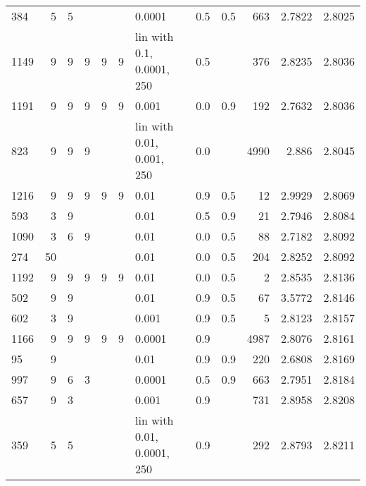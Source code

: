 \begin{longtable}{lrrrrrlrrrrr}
  384 &       5 & 5 &   &   &   &                      0.0001 &      0.5 &    0.5 &     663 &     2.7822 &        2.8025 \\
 1149 &       9 & 9 & 9 & 9 & 9 &   lin with 0.1, 0.0001, 250 &      0.5 &        &     376 &     2.8235 &        2.8036 \\
 1191 &       9 & 9 & 9 & 9 & 9 &                       0.001 &      0.0 &    0.9 &     192 &     2.7632 &        2.8036 \\
  823 &       9 & 9 & 9 &   &   &   lin with 0.01, 0.001, 250 &      0.0 &        &    4990 &      2.886 &        2.8045 \\
 1216 &       9 & 9 & 9 & 9 & 9 &                        0.01 &      0.9 &    0.5 &      12 &     2.9929 &        2.8069 \\
  593 &       3 & 9 &   &   &   &                        0.01 &      0.5 &    0.9 &      21 &     2.7946 &        2.8084 \\
 1090 &       3 & 6 & 9 &   &   &                        0.01 &      0.0 &    0.5 &      88 &     2.7182 &        2.8092 \\
  274 &      50 &   &   &   &   &                        0.01 &      0.0 &    0.5 &     204 &     2.8252 &        2.8092 \\
 1192 &       9 & 9 & 9 & 9 & 9 &                        0.01 &      0.0 &    0.5 &       2 &     2.8535 &        2.8136 \\
  502 &       9 & 9 &   &   &   &                        0.01 &      0.9 &    0.5 &      67 &     3.5772 &        2.8146 \\
  602 &       3 & 9 &   &   &   &                       0.001 &      0.9 &    0.5 &       5 &     2.8123 &        2.8157 \\
 1166 &       9 & 9 & 9 & 9 & 9 &                      0.0001 &      0.9 &        &    4987 &     2.8076 &        2.8161 \\
   95 &       9 &   &   &   &   &                        0.01 &      0.9 &    0.9 &     220 &     2.6808 &        2.8169 \\
  997 &       9 & 6 & 3 &   &   &                      0.0001 &      0.5 &    0.9 &     663 &     2.7951 &        2.8184 \\
  657 &       9 & 3 &   &   &   &                       0.001 &      0.9 &        &     731 &     2.8958 &        2.8208 \\
  359 &       5 & 5 &   &   &   &  lin with 0.01, 0.0001, 250 &      0.9 &        &     292 &     2.8793 &        2.8211 \\

\end{longtable}
